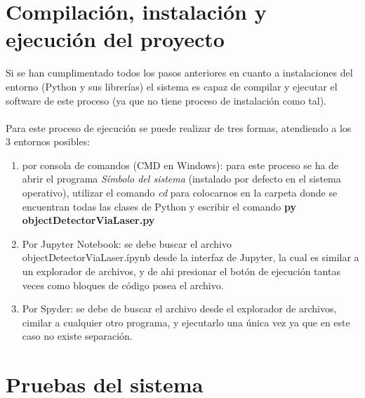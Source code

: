 \section{Compilación, instalación y ejecución del proyecto}
Si se han cumplimentado todos los pasos anteriores en cuanto a instalaciones del entorno (Python y sus librerías) el sistema es capaz de compilar y ejecutar el software de este proceso (ya que no tiene proceso de instalación como tal).\\
\\
Para este proceso de ejecución se puede realizar de tres formas, atendiendo a los 3 entornos posibles:
\begin{enumerate}
	\item por consola de comandos (CMD en Windows): para este proceso se ha de abrir el programa \textit{Símbolo del sistema} (instalado por defecto en el sistema operativo), utilizar el comando \textit{cd} para colocarnos en la carpeta donde se encuentran todas las clases de Python y escribir el comando \textbf{py objectDetectorViaLaser.py}
	\item Por Jupyter Notebook: se debe buscar el archivo objectDetectorViaLaser.ípynb desde la interfaz de Jupyter, la cual es similar a un explorador de archivos, y de ahi presionar el botón de ejecución tantas veces como bloques de código posea el archivo.
	\item Por Spyder: se debe de buscar el archivo desde el explorador de archivos, cimilar a cualquier otro programa, y ejecutarlo una única vez ya que en este caso no existe separación. 
\end{enumerate}
\section{Pruebas del sistema}
